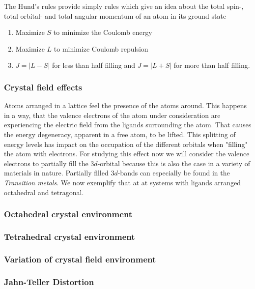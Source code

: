 \documentclass[10pt]{report}
\numberwithin{equation}{chapter}
\begin{document}
The Hund's rules provide simply rules which give an idea about the total spin-, total orbital- and total angular momentum of an atom in its ground state

\begin{enumerate}
  \item{Maximize $S$ to minimize the Coulomb energy}
  \item{Maximize $L$ to minimize Coulomb repulsion}
  \item{ $J=|L-S|$ for less than half filling and $J=|L+S|$ for more than half filling.}
\end{enumerate}

\subsubsection{Crystal field effects}

Atoms arranged in a lattice feel the presence of the atoms around. This happens in a way, that the valence electrons of the atom under consideration are experiencing the electric field from the ligands surrounding the atom. That causes the energy degeneracy, apparent in a free atom, to be lifted. This splitting of energy levels has impact on the occupation of the different orbitals when "filling" the atom with electrons.
For studying this effect now we will consider the valence electrons to partially fill the $3d$-orbital because this is also the case in a variety of materials in nature. Partially filled $3d$-bands can especially be found in the \textit{Transition metals}. 
 We now exemplify that at at systems with ligands arranged octahedral and tetragonal. 


\subsubsection{Octahedral crystal environment}



\subsubsection{Tetrahedral crystal environment}


\subsubsection{Variation of crystal field environment}


\subsubsection{Jahn-Teller Distortion}
\end{document}
